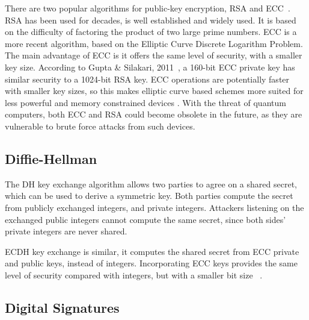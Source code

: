 There are two popular algorithms for public-key encryption, \ac{RSA} and \ac{ECC}~\cite{mahto2016security}.
\ac{RSA} has been used for decades, is well established and widely used. It is based on the difficulty of factoring the product of two large prime numbers.
\ac{ECC} is a more recent algorithm, based on the Elliptic Curve Discrete Logarithm Problem. The main advantage of \ac{ECC} is it offers the same level of security, with a smaller key size. According to Gupta \& Silakari, 2011~\cite{eccoverrsa}, a 160-bit \ac{ECC} private key has similar security to a 1024-bit \ac{RSA} key.
\ac{ECC} operations are potentially faster with smaller key sizes, so this makes elliptic curve based schemes more suited for less powerful and memory constrained devices \cite{selvakumaraswamy2016efficient}.
With the threat of quantum computers, both \ac{ECC} and \ac{RSA} could become obsolete in the future, as they are vulnerable to brute force attacks from such devices.

\subsection{Diffie-Hellman}\label{chap:background:crypto:ecdh}

The \ac{DH} key exchange algorithm allows two parties to agree on a shared secret, which can be used to derive a symmetric key. Both parties compute the secret from publicly exchanged integers, and private integers. Attackers listening on the exchanged public integers cannot compute the same secret, since both sides' private integers are never shared.

\ac{ECDH} key exchange is similar, it computes the shared secret from \ac{ECC} private and public keys, instead of integers. Incorporating \ac{ECC} keys provides the same level of security compared with integers, but with a smaller bit size ~\cite{fiskiran2002workload}.

\subsection{Digital Signatures}\label{chap:background:crypto:signatures}

